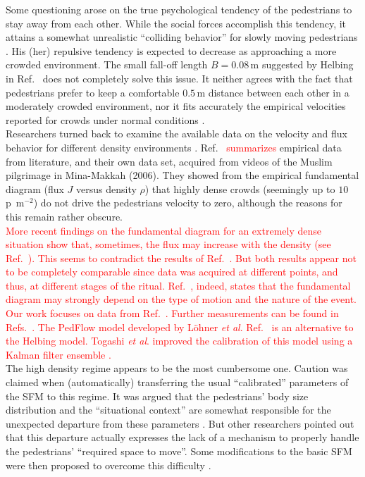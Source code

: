 \documentclass[preprint,12pt]{elsarticle}
\begin{document}
Some questioning arose on the true psychological tendency of the pedestrians to 
stay away from each other. While the social forces accomplish this tendency, it 
attains a somewhat unrealistic ``colliding behavior'' for slowly moving 
pedestrians \cite{Lakoba}. His (her) repulsive tendency is expected to decrease 
as approaching a more crowded environment. The small fall-off length $B=0.08\,$m 
suggested by Helbing in Ref.~\cite{Helbing1} does not completely solve this 
issue. It neither agrees with the fact that pedestrians prefer to keep a 
comfortable $0.5\,$m distance between each other in a moderately crowded 
environment, nor it fits accurately the empirical velocities reported for 
crowds under normal conditions \cite{Lakoba}.  \\

Researchers turned back to examine the available data on the velocity and flux 
behavior for different density environments \cite{Boltes,helbing3,seyfried1,seyfried}. 
Ref.~\cite{helbing3} \textcolor{red}{summarizes} empirical data from 
literature, and their own data set, acquired from videos of the Muslim 
pilgrimage in Mina-Makkah (2006). They showed from the empirical fundamental 
diagram (flux $J$ versus density $\rho$) that highly dense crowds (seemingly up 
to $10\,$p~m$^{-2}$) do not drive the pedestrians velocity to zero, although the 
reasons for this remain rather obscure.   \\

\textcolor{red}{More recent findings on the fundamental diagram for an extremely dense
 situation show that, sometimes, the flux may increase with the density (see 
Ref.~\cite{lohner1}). This seems to contradict the results of 
Ref.~\cite{helbing3}. But both results appear not to be completely  comparable 
since data was acquired at different points, and thus,
at different stages of the ritual. Ref.~\cite{lohner1}, indeed, states that the fundamental 
diagram may strongly depend on the type of motion and the nature of the event.}\\


\textcolor{red}{Our work focuses on data from Ref.~\cite{helbing3}. 
Further measurements can be found in 
Refs.~\cite{Boltes,lohner1,Dridi1,Dridi2,Baqui1}.
The PedFlow model developed by L\"ohner \textit{et al}. Ref.~\cite{lohner2}  
is an alternative to the Helbing model. Togashi \textit{et al}. improved the 
calibration of this model using a Kalman filter ensemble \cite{Togashi1}. }\\

The high density regime appears to be the most cumbersome one. Caution was 
claimed when (automatically) transferring the usual ``calibrated'' parameters 
of the SFM to this regime. It was argued that the pedestrians' body size 
distribution and the ``situational context'' are somewhat responsible for the 
unexpected departure from these parameters \cite{kwak,johansson1}. But other 
researchers pointed out that this departure actually expresses the lack of a 
mechanism to properly handle the pedestrians' ``required space to move''. Some 
modifications to the basic SFM were then proposed to overcome this difficulty 
\cite{parisi2,seyfried2}. \\
\end{document}

